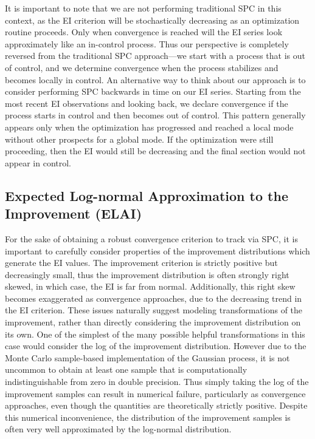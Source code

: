 \documentclass{article}
\begin{document}
%
It is important to note that we are not performing traditional SPC in this 
context, as the EI criterion will be stochastically decreasing as an optimization 
routine proceeds. Only when convergence is reached will the EI series look 
approximately like an in-control process. Thus our perspective is completely 
reversed from the traditional SPC approach---we start with a process that is 
out of control, and we determine convergence when the process stabilizes and 
becomes locally in control. An alternative way to think about our approach is 
to consider performing SPC backwards in time on our EI series. Starting from 
the most recent EI observations and looking back, we declare convergence if 
the process starts in control and then becomes out of control. This pattern 
generally appears only when the optimization has progressed and reached a 
local mode without other prospects for a global mode.  If the
optimization were still proceeding, then the EI would  
still be decreasing and the final section would not appear in control.

%
%
\subsection{Expected Log-normal Approximation to the Improvement (ELAI)}
%
%

%
For the sake of obtaining a robust convergence criterion to track via SPC, it 
is important to carefully consider properties of the improvement distributions 
which generate the EI values. 
The improvement criterion is strictly positive but decreasingly small, thus 
the improvement distribution is often strongly right skewed, in which case, 
the EI is far from normal. Additionally, this right skew becomes exaggerated as 
convergence approaches, due to the decreasing trend in the EI criterion. 
These issues naturally suggest modeling 
transformations of the improvement, rather than directly considering the 
improvement distribution on its own. One of the simplest of the many possible 
helpful transformations in this case would consider the log of the improvement 
distribution. However due to the Monte Carlo sample-based implementation of the 
Gaussian process, it is not uncommon to obtain at least one sample 
that is computationally indistinguishable from zero in double precision. Thus 
simply taking the log of the improvement samples can result in numerical 
failure, particularly as convergence approaches, even though the quantities 
are theoretically strictly positive. Despite this numerical inconvenience, the 
distribution of the improvement samples is often very well approximated by the 
log-normal distribution. 
\end{document}
